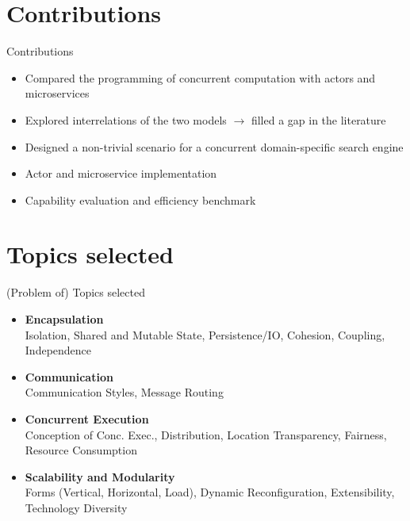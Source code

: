 \documentclass{beamer}
\begin{document}

\section{Contributions}


\begin{frame}{Contributions}

\begin{itemize}
  \item Compared the programming of concurrent computation with actors and microservices
  \item Explored interrelations of the two models $\rightarrow$ filled a gap in the literature
  \item Designed a non-trivial scenario for a concurrent domain-specific search engine
  \item Actor and microservice implementation
  \item Capability evaluation and efficiency benchmark
\end{itemize}

\end{frame}


\section{Topics selected}


\begin{frame}{(Problem of) Topics selected}

\begin{itemize}
  \item \textbf{Encapsulation} \\%
        Isolation, Shared and Mutable State, Persistence/IO, Cohesion, Coupling, Independence
  \item \textbf{Communication} \\%
        Communication Styles, Message Routing
  \item \textbf{Concurrent Execution} \\%
        Conception of Conc. Exec., Distribution, Location Transparency, Fairness, Resource Consumption
  \item \textbf{Scalability and Modularity} \\%
        Forms (Vertical, Horizontal, Load), Dynamic Reconfiguration, Extensibility, Technology Diversity
\end{itemize}

\end{frame}
\end{document}
